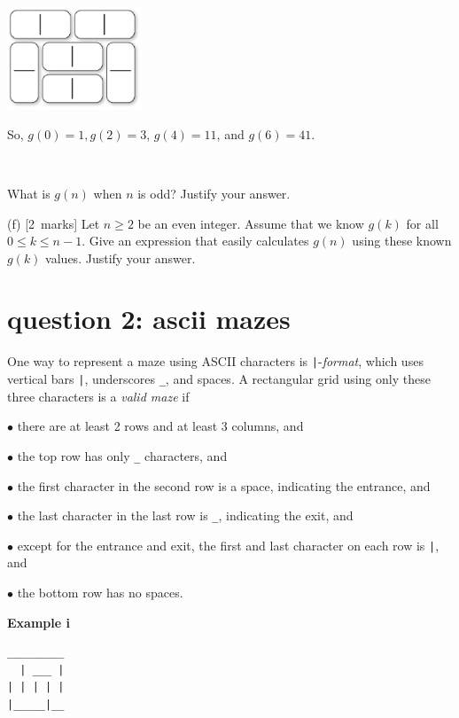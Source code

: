\documentclass[12pt]{article}
\newcommand{\mymarks}[1]{\mbox{\small [#1 marks]}}
\begin{document}
\vspace{-5mm}
\begin{center}
\includegraphics[width=40mm]{Figures/34-tiling.eps}
\end{center}
\vspace{-5mm}
\noindent
So, $g(0) = 1, g(2) = 3$, $g(4) = 11$, and $g(6) = 41$.

~

\noindent
What is $g(n)$ when $n$ is odd? Justify your answer.

\vfill

\noindent
(f) \mymarks{2}
Let $n \geq 2$ be an even integer. 
Assume that we know $g(k)$ for all $0 \leq k \leq n-1$. 
Give an expression that easily calculates $g(n)$
using these known $g(k)$ values. Justify your answer.


\vfill
\vfill


\newpage
\section*{question 2: ascii mazes}

One way to represent a maze using ASCII characters is
\texttt{|}-{\em format}, which uses 
vertical bars \verb&|&, underscores \verb&_&, and spaces.
A rectangular grid using only these three 
characters is a {\em valid maze} if

$\bullet$ there are at least 2 rows and at least 3 columns, and

$\bullet$ the top row has only \verb&_& characters, and

$\bullet$ the first character in the second row 
is a space, indicating the entrance, and

$\bullet$ the last character in the last row is \verb&_&,
indicating the exit, and

$\bullet$ except for the entrance and exit,
the first and last character on each row is \verb&|&,  and

$\bullet$
the bottom row has no spaces.

\noindent
\begin{minipage}[c]{3cm}
{\bf Example i}
\end{minipage}
\begin{minipage}[c]{10cm}
\begin{verbatim}
_________
  | ___ |
| | | | |
|_____|__

\end{verbatim}
\end{minipage}
\end{document}
